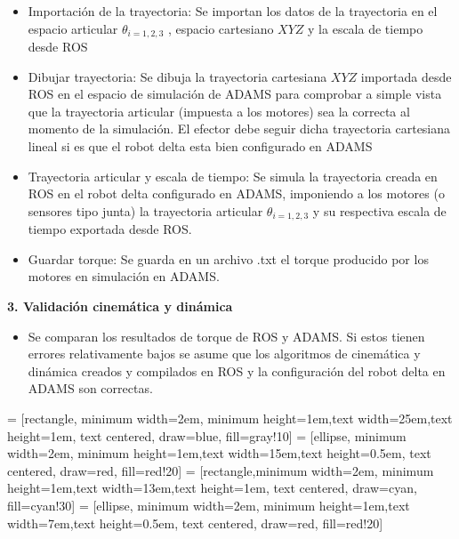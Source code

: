         \begin{itemize}
            \item {Importación de la trayectoria: Se importan los datos de la trayectoria en el espacio articular $\theta_{i=1,2,3}$ , espacio cartesiano $XYZ$ y la escala de tiempo desde ROS}
            \item {Dibujar trayectoria: Se dibuja la trayectoria cartesiana $XYZ$ importada desde ROS en el espacio de simulación de ADAMS para comprobar a simple vista que la trayectoria articular (impuesta a los motores) sea la correcta al momento de la simulación. El efector debe seguir dicha trayectoria cartesiana lineal si es que el robot delta esta bien configurado en ADAMS}
            \item {Trayectoria articular y escala de tiempo: Se simula la trayectoria creada en ROS en el robot delta configurado en ADAMS, imponiendo a los motores (o sensores tipo junta) la trayectoria articular $\theta_{i=1,2,3}$ y su respectiva escala de tiempo exportada desde ROS.}
            \item {Guardar torque: Se guarda en un archivo .txt el torque producido por los motores en simulación en ADAMS.  }
        \end{itemize}
        \item \textbf{3. Validación 
        cinemática y dinámica}
        \begin{itemize}
            \item {Se comparan los resultados de torque de ROS y ADAMS. Si estos tienen errores relativamente bajos se asume que los algoritmos de cinemática y dinámica creados y compilados en ROS y la configuración del robot delta en ADAMS son correctas.}
        \end{itemize}  

        \newpage
        
     = [rectangle, minimum width=2em, minimum height=1em,text width=25em,text height=1em, text centered, draw=blue, fill=gray!10]
     = [ellipse, minimum width=2em, minimum height=1em,text width=15em,text height=0.5em, text centered, draw=red, fill=red!20]
     = [rectangle,minimum width=2em, minimum height=1em,text width=13em,text height=1em, text centered, draw=cyan, fill=cyan!30]
     = [ellipse, minimum width=2em, minimum height=1em,text width=7em,text height=0.5em, text centered, draw=red, fill=red!20]

